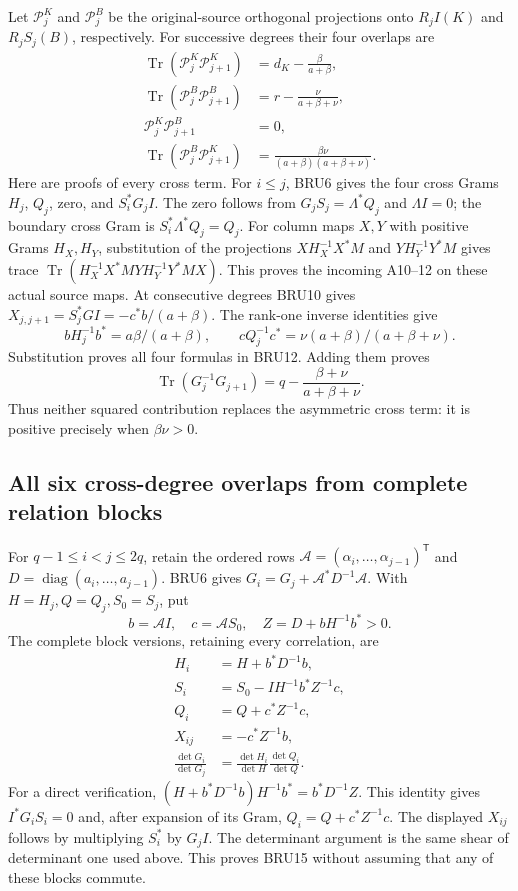 Let $\mathcal P_j^K$ and $\mathcal P_j^B$ be the original-source
orthogonal projections onto $R_jI(K)$ and $R_jS_j(B)$, respectively.
For successive degrees their four overlaps are
\[
 \boxed{\begin{aligned}
 \operatorname{Tr}(\mathcal P_j^K\mathcal P_{j+1}^K)
    &=d_K-\frac{\beta}{a+\beta},\\
 \operatorname{Tr}(\mathcal P_j^B\mathcal P_{j+1}^B)
    &=r-\frac{\nu}{a+\beta+\nu},\\
 \mathcal P_j^K\mathcal P_{j+1}^B&=0,\\
 \operatorname{Tr}(\mathcal P_j^B\mathcal P_{j+1}^K)
    &=\frac{\beta\nu}{(a+\beta)(a+\beta+\nu)}.
 \end{aligned}}\tag{BRU12}
\]
Here are proofs of every cross term. For $i\leq j$, BRU6 gives
the four cross Grams $H_j$, $Q_j$, zero, and $S_i^*G_jI$.
The zero follows from $G_jS_j=\Lambda^*Q_j$ and $\Lambda I=0$;
the boundary cross Gram is $S_i^*\Lambda^*Q_j=Q_j$.
For column maps $X,Y$ with positive Grams $H_X,H_Y$, substitution
of the projections $XH_X^{-1}X^*M$ and $YH_Y^{-1}Y^*M$ gives
trace $\operatorname{Tr}(H_X^{-1}X^*MYH_Y^{-1}Y^*MX)$.
This proves the incoming A10--12 on these actual source maps.
At consecutive degrees BRU10 gives
$X_{j,j+1}=S_j^*GI=-c^*b/(a+\beta)$.
The rank-one inverse identities give
\[
 bH_j^{-1}b^*=a\beta/(a+\beta),\qquad
 cQ_j^{-1}c^*=\nu(a+\beta)/(a+\beta+\nu).
\]
Substitution proves all four formulas in BRU12. Adding them proves
\[
 \operatorname{Tr}(G_j^{-1}G_{j+1})
       =q-\frac{\beta+\nu}{a+\beta+\nu}.
 \tag{BRU13}
\]
Thus neither squared contribution replaces the asymmetric cross
term: it is positive precisely when $\beta\nu>0$.

\subsection{All six cross-degree overlaps from complete relation blocks}

For $q-1\leq i<j\leq2q$, retain the ordered rows
$\mathcal A=(\alpha_i,\ldots,\alpha_{j-1})^{\mathsf T}$ and
$D=\operatorname{diag}(a_i,\ldots,a_{j-1})$. BRU6 gives
$G_i=G_j+\mathcal A^*D^{-1}\mathcal A$.
With $H=H_j,Q=Q_j,S_0=S_j$, put
\[
 b=\mathcal A I,\quad c=\mathcal A S_0,\quad
 Z=D+bH^{-1}b^*>0.
 \tag{BRU14}
\]
The complete block versions, retaining every correlation, are
\[
 \boxed{\begin{aligned}
 H_i&=H+b^*D^{-1}b,\\
 S_i&=S_0-IH^{-1}b^*Z^{-1}c,\\
 Q_i&=Q+c^*Z^{-1}c,\\
 X_{ij}&=-c^*Z^{-1}b,\\
 \frac{\det G_i}{\det G_j}
 &=\frac{\det H_i}{\det H}\frac{\det Q_i}{\det Q}.
 \end{aligned}}\tag{BRU15}
\]
For a direct verification,
$(H+b^*D^{-1}b)H^{-1}b^*=b^*D^{-1}Z$.
This identity gives $I^*G_iS_i=0$ and, after expansion of its
Gram, $Q_i=Q+c^*Z^{-1}c$. The displayed $X_{ij}$ follows by
multiplying $S_i^*$ by $G_jI$. The determinant argument is the
same shear of determinant one used above. This proves BRU15
without assuming that any of these blocks commute.

